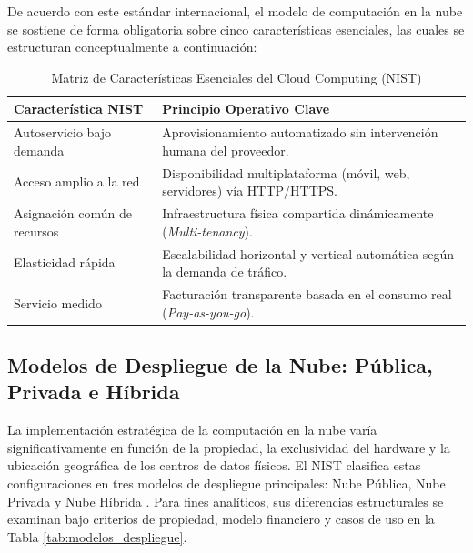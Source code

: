 \documentclass[12pt,a4paper]{article}
\begin{document}
De acuerdo con este estándar internacional, el modelo de computación en la nube se sostiene de forma obligatoria sobre cinco características esenciales, las cuales se estructuran conceptualmente a continuación:

\vspace{0.3cm}
\begin{table}[H]
\centering
\caption{Matriz de Características Esenciales del Cloud Computing (NIST)}
\label{tab:nist_caracteristicas}
\begin{tabular}{ p{4.5cm} p{8cm} }
\toprule
\textbf{Característica NIST} & \textbf{Principio Operativo Clave} \\
\midrule
Autoservicio bajo demanda & Aprovisionamiento automatizado sin intervención humana del proveedor. \\
Acceso amplio a la red & Disponibilidad multiplataforma (móvil, web, servidores) vía HTTP/HTTPS. \\
Asignación común de recursos & Infraestructura física compartida dinámicamente (\textit{Multi-tenancy}). \\
Elasticidad rápida & Escalabilidad horizontal y vertical automática según la demanda de tráfico. \\
Servicio medido & Facturación transparente basada en el consumo real (\textit{Pay-as-you-go}). \\
\bottomrule
\end{tabular}
\end{table}
\vspace{0.3cm}
\subsection{Modelos de Despliegue de la Nube: Pública, Privada e Híbrida}

La implementación estratégica de la computación en la nube varía significativamente en función de la propiedad, la exclusividad del hardware y la ubicación geográfica de los centros de datos físicos. El NIST clasifica estas configuraciones en tres modelos de despliegue principales: Nube Pública, Nube Privada y Nube Híbrida \parencite{mell2011}. Para fines analíticos, sus diferencias estructurales se examinan bajo criterios de propiedad, modelo financiero y casos de uso en la Tabla \ref{tab:modelos_despliegue}.
\end{document}
